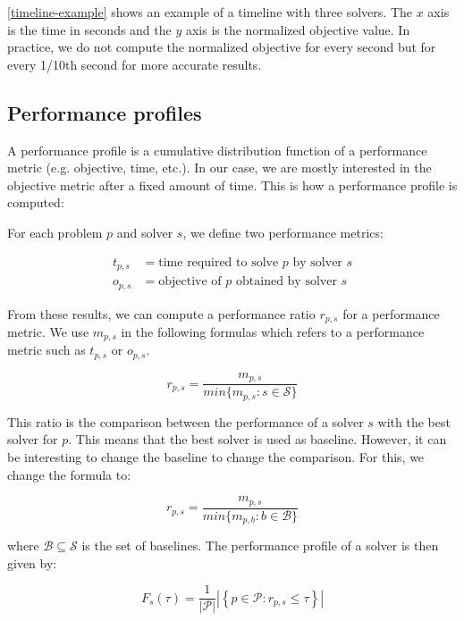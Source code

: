 \documentclass[../../thesis.tex]{subfiles}
\begin{document}
\autoref{timeline-example} shows an example of a timeline with three solvers. The $x$ axis is the time in seconds and the $y$ axis is the normalized objective 
value. In practice, we do not compute the normalized objective for every second but for every 1/10th second for more accurate results.



\subsection{Performance profiles}

A performance profile \cite{Dolan2002} is a cumulative distribution function of a performance metric (e.g. objective, time, etc.).
In our case, we are mostly interested in the objective metric after a fixed amount of time.
This is how a performance profile is computed:

For each problem $p$ and solver $s$, we define two performance metrics:

\begin{align*}
  t_{p, s} &= \text{time required to solve $p$ by solver $s$} \\
  o_{p, s} &= \text{objective of $p$ obtained by solver $s$}
\end{align*}


From these results, we can compute a performance ratio $r_{p, s}$ for a performance metric.
We use $m_{p, s}$ in the following formulas which refers to a performance metric such as $t_{p, s}$ or $o_{p, s}$.

\begin{equation}
  r_{p, s} = \frac{m_{p, s}}{min\{ m_{p, s} : s \in \mathcal{S} \}}
\end{equation}

This ratio is the comparison between the performance of a solver $s$ with the best solver for $p$.
This means that the best solver is used as baseline. However, it can be interesting to change 
the baseline to change the comparison. For this, we change the formula \cite{Cauwelaert2017AVW} to:

\begin{equation}
  r_{p, s} = \frac{m_{p, s}}{min\{ m_{p, b} : b \in \mathcal{B} \} }
\end{equation}

where $\mathcal{B} \subseteq \mathcal{S}$ is the set of baselines.
The performance profile of a solver is then given by:


\begin{equation}
  F_s(\tau) = \frac{1}{|\mathcal{P}|} \left| \left\{ p \in \mathcal{P} : r_{p, s} \leq \tau \right\} \right|
\end{equation}
\end{document}
